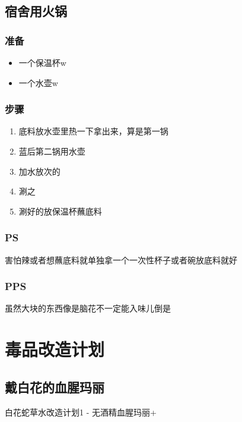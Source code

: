 \documentclass[12pt, a4paper]{ctexart}
\begin{document}
\subsection{宿舍用火锅}
\subsubsection{准备}
\begin{itemize}
    \item{一个保温杯w}
    \item{一个水壶w}
\end{itemize}

\subsubsection{步骤}
\begin{enumerate}[start=0]
    \item{底料放水壶里热一下拿出来，算是第一锅}
    \item{蓝后第二锅用水壶}
    \item{加水放次的}
    \item{涮之}
    \item{涮好的放保温杯蘸底料}
\end{enumerate}

\subsubsection{PS}
害怕辣或者想蘸底料就单独拿一个一次性杯子或者碗放底料就好

\subsubsection{PPS}
虽然大块的东西像是脑花不一定能入味儿倒是

\newpage
\section{毒品改造计划}

\subsection{戴白花的血腥玛丽}
白花蛇草水改造计划1 - 无酒精血腥玛丽+
\end{document}
